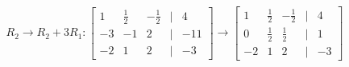 \documentclass[preview]{standalone}
\begin{document}
\begin{align*}
R_2 \rightarrow R_2 + 3R_1: \begin{bmatrix} 1 & \frac{1}{2} & -\frac{1}{2} & | & 4 \\ -3 & -1 & 2 & | & -11 \\ -2 & 1 & 2 & | & -3 \end{bmatrix} \rightarrow \begin{bmatrix} 1 & \frac{1}{2} & -\frac{1}{2} & | & 4 \\ 0 & \frac{1}{2} & \frac{1}{2} & | & 1 \\ -2 & 1 & 2 & | & -3 \end{bmatrix}
\end{align*}
\end{document}
